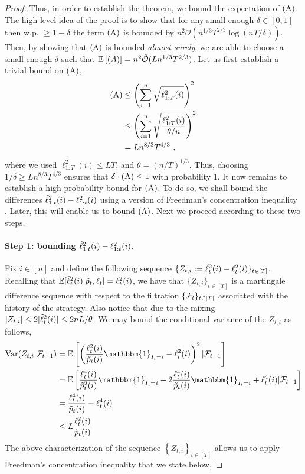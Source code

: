 \begin{proof}
 Thus, in order to establish the theorem, we bound the expectation of  $\rm{(A)}$.
 The high level idea of the proof is to show that for any small enough  $\delta\in[0,1] $ then  w.p. $\geq 1-\delta$ the term $\rm{(A)}$ is bounded by $n^2 \mathcal{O}(n^{1/3}T^{2/3}\log(nT/\delta))$.  Then, by showing that $\rm{(A)}$ is bounded \emph{almost surely},  we are able to  choose a small enough $\delta$ such that  $\mathbb{E}\left[ (A) \right] =n^2 \tilde{\mathcal{O}}(Ln^{1/3}T^{2/3})$. 
 Let us first establish a trivial bound on $\rm{(A)}$,
 \begin{align*}
\rm{(A)} 
&\leq
 \left(\sumin \sqrt{\tell_{1:T}^2(i)}  \right)^2 \\
 &\leq
 \left(\sumin \sqrt{ \frac{\ell_{1:T}^2(i)}{\theta/n}   }  \right)^2 \\
 &=
 Ln^{8/3}T^{4/3}~,
 \end{align*}
 where we used $\ell_{1:T}^2(i) \leq LT$, and $\theta = (n/T)^{1/3}$.
Thus, choosing $1/\delta \geq  Ln^{8/3}T^{4/3}$  ensures that  $\delta \cdot\rm{(A)}\leq 1$ with probability 1.
It now remains to establish a high probability bound for $\rA$.
To do so, we shall bound  the differences $\tilde{\ell}_{1:t}^2(i) -\ell_{1:t}^2(i)$ using  a version of Freedman's concentration inequality \citep{freedman1975tail}.
Later, this will enable us to bound $\rA$. Next we proceed according to these two steps.
 
\paragraph{Step 1: bounding $\tilde{\ell}_{1:t}^2(i) -\ell_{1:t}^2(i)$.\\} 
 Fix $i\in[n]$ and define the following sequence $\{Z_{t,i}: = \tilde{\ell}_t^2(i) - \ell_t^2(i) \}_{t\in[T]}$. Recalling that $\mathbb{E}[\tilde{\ell}_t^2(i) \vert \tilde{p}_t,\ell_t] = \ell_t^2(i)$, we have that $\{ Z_{t,i}\}_{t\in[T]}$ is a martingale difference sequence with respect to the filtration $\{\mathcal{F}_{t}\}_{t\in[T]}$ associated with the history of the strategy. Also notice that due to the mixing $|Z_{t,i}| \leq 2| \tilde{\ell}_t^2(i) | \leq 2nL/\theta$. We may bound the conditional variance of the  $Z_{t,i}$ as follows,
 \begin{align}\label{eq:VarExpression}
 \Var(Z_{t,i}\vert \F_{t-1})
 & = 
\expval{ \left( \frac{\ell_t^2(i)}{\tp_t(i)}\mathbbm{1} _{I_t=i} - \ell_t^2(i)   \right)^2\vert \F_{t-1}}  \nonumber\\
 & = 
\expval{ \frac{\ell_t^4(i)}{\tp^2_t(i)}\mathbbm{1} _{I_t=i} -2\frac{\ell_t^4(i)}{\tp_t(i)}\mathbbm{1} _{I_t=i} + \ell_t^4(i)   \vert \F_{t-1}}  \nonumber\\
 &=
 \frac{\ell_t^4(i)}{\tp_t(i)} - \ell_t^4(i) \nonumber\\
 &\leq
 L\frac{\ell_t^2(i)}{\tp_t(i)} 
 \end{align}
 The above characterization of the sequence  $\left\{Z_{t,i} \right\}_{t\in[T]}$ allows us to apply Freedman's concentration inequality that we state below,


\end{proof}
